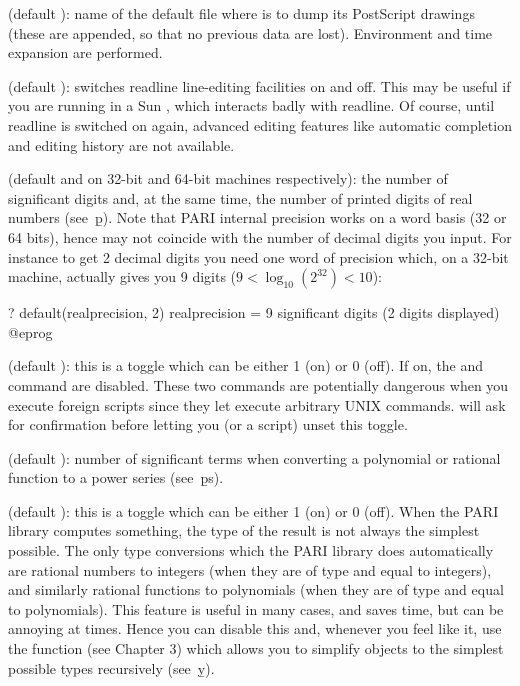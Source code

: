  (default ): name of the default file where
 is to dump its PostScript drawings (these are appended, so that no
previous data are lost). Environment and time expansion are performed.

 (default ): switches readline line-editing
facilities on and off. This may be useful if you are running  in a Sun
, which interacts badly with readline. Of course, until readline
is switched on again, advanced editing features like automatic completion
and editing history are not available.

 (default  and  on 32-bit and 64-bit machines respectively): the number of significant digits and, at the same
time, the number of printed digits of real numbers (see~\b{p}). Note that
PARI internal precision works on a word basis (32 or 64 bits), hence may not
coincide with the number of decimal digits you input. For instance to get 2
decimal digits you need one word of precision which, on a 32-bit machine,
actually gives you 9 digits ($9 < \log_{10}(2^{32}) < 10$):

\bprog
? default(realprecision, 2)
      realprecision = 9 significant digits (2 digits displayed)
@eprog

 (default ): this is a toggle which can be either 1
(on) or 0 (off). If on, the  and  command are
disabled. These two commands are potentially dangerous when you execute
foreign scripts since they let  execute arbitrary UNIX commands.
 will
ask for confirmation before letting you (or a script) unset this toggle.

 (default ): number of significant terms
when converting a polynomial or rational function to a power series
(see~\b{ps}).

 (default ): this is a toggle which can be either
1 (on) or 0 (off). When the PARI library computes something, the type of the
result is not always the simplest possible. The only type conversions which
the PARI library does automatically are rational numbers to integers (when
they are of type  and equal to integers), and similarly rational
functions to polynomials (when they are of type  and equal to
polynomials). This feature is useful in many cases, and saves time, but can
be annoying at times. Hence you can disable this and, whenever you feel like
it, use the function  (see Chapter 3) which allows you to
simplify objects to the simplest possible types recursively (see~\b{y}).

